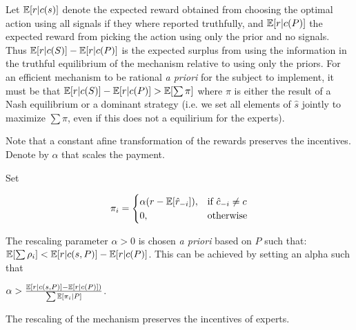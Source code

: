 Let $\operatorname*{\mathbb E}[r|c(s)]$ denote the expected reward obtained from choosing the optimal action using all signals if they where reported truthfully, and $\operatorname*{\mathbb E}[r|c(P)] $ the expected reward from picking the action using only the prior and no signals. Thus $\operatorname*{\mathbb E}[r|c(S)] - \operatorname*{\mathbb E}[r|c(P)] $ is the expected surplus from using the information in the truthful equilibrium of the mechanism relative to using only the priors. For an efficient mechanism to be rational \emph{a priori} for the subject to implement, it must be that $\operatorname*{\mathbb E}[r|c(S)] - \operatorname*{\mathbb E}[r|c(P)] > \operatorname*{\mathbb E}[\sum \pi]$ where $\pi$ is either the result of a Nash equilibrium or a dominant strategy (i.e. we set all elements of $\hat{s}$ jointly to maximize $\sum \pi$, even if this does not a equilirium for the experts).

Note that a constant afine transformation of the rewards preserves the incentives. Denote by $\alpha$ that scales the payment.

\begin{mech}
Set

\[
    \pi_i = 
\begin{cases}
    \alpha (r - \expec[\hat{r}_{-i}] ),& \text{if } \hat{c}_{-i} \neq c\\
    0,              & \text{otherwise}
\end{cases}
\]

The rescaling parameter $\alpha>0$ is chosen \emph{a priori} based on $P$ such that: $ \operatorname*{\mathbb E}[\sum \rho_i] < \operatorname*{\mathbb E}[r|c(s,P)] - \operatorname*{\mathbb E}[r|c(P)] $. This can be achieved by setting an alpha such that

 $\alpha >   \frac{\operatorname*{\mathbb E}[r|c(s,P)] - \operatorname*{\mathbb E}[r|c(P)] )}{\sum \operatorname*{\mathbb E}[\pi_i|P] }  $. 

\end{mech}



\begin{lem}
	The rescaling of the mechanism preserves the incentives of experts.
\end{lem}

